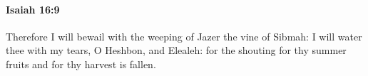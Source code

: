 
		\paragraph{Isaiah 16:9} %
			\label{ISAIAH-16-9}

			Therefore I will bewail with the weeping of Jazer the vine of Sibmah: I will water thee with my tears, O Heshbon, and Elealeh: for the shouting for thy summer fruits and for thy harvest is fallen.


